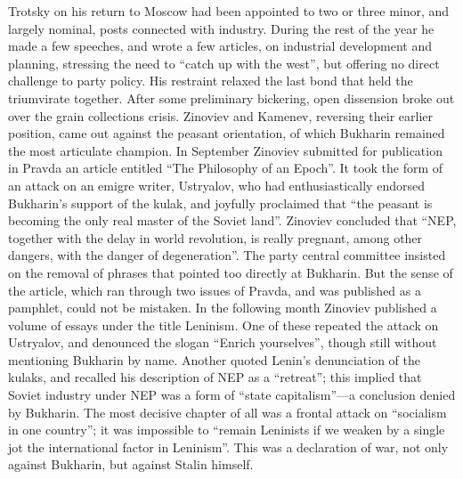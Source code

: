 Trotsky on his return to Moscow had been appointed to two or three minor, and largely nominal, posts connected with industry. During the rest of the year he made a few speeches, and wrote a few articles, on industrial development and planning, stressing the need to ``catch up with the west'', but offering no direct challenge to party policy. His restraint relaxed the last bond that held the triumvirate together. After some preliminary bickering, open dissension broke out over the grain collections crisis. Zinoviev and Kamenev, reversing their earlier position, came out against the peasant orientation, of which Bukharin remained the most articulate champion. In September Zinoviev submitted for publication in Pravda an article entitled ``The Philosophy of an Epoch''. It took the form of an attack on an emigre writer, Ustryalov, who had enthusiastically endorsed Bukharin's support of the kulak, and joyfully proclaimed that ``the peasant is becoming the only real master of the Soviet land''. Zinoviev concluded that ``NEP, together with the delay in world revolution, is really pregnant, among other dangers, with the danger of degeneration''. The party central committee insisted on the removal of phrases that pointed too directly at Bukharin. But the sense of the article, which ran through two issues of Pravda, and was published as a pamphlet, could not be mistaken. In the following month Zinoviev published a volume of essays under the title Leninism. One of these repeated the attack on Ustryalov, and denounced the slogan ``Enrich yourselves'', though still without mentioning Bukharin by name. Another quoted Lenin's denunciation of the kulaks, and recalled his description of NEP as a ``retreat''; this implied that Soviet industry under NEP was a form of ``state capitalism''---a conclusion denied by Bukharin. The most decisive chapter of all was a frontal attack on ``socialism in one country''; it was impossible to ``remain Leninists if we weaken by a single jot the international factor in Leninism''. This was a declaration of war, not only against Bukharin, but against Stalin himself. 

